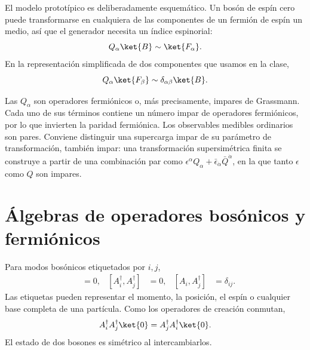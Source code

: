 El modelo prototípico es deliberadamente esquemático. Un bosón de espín cero puede transformarse en cualquiera de las componentes de un fermión de espín un medio, así que el generador necesita un índice espinorial:
\begin{equation}
Q_\alpha\ket{B}\sim\ket{F_\alpha}.
\end{equation}
En la representación simplificada de dos componentes que usamos en la clase,
\begin{equation}
Q_\alpha\ket{F_\beta}\sim\delta_{\alpha\beta}\ket{B}.
\end{equation}

\begin{classroomqa}
\end{classroomqa}

Las \(Q_\alpha\) son operadores fermiónicos o, más precisamente, impares de Grassmann. Cada uno de sus términos contiene un número impar de operadores fermiónicos, por lo que invierten la paridad fermiónica. Los observables medibles ordinarios son pares. Conviene distinguir una supercarga impar de su parámetro de transformación, también impar: una transformación supersimétrica finita se construye a partir de una combinación par como \(\epsilon^\alpha Q_\alpha+\bar\epsilon_{\dot\alpha}\bar Q^{\dot\alpha}\), en la que tanto \(\epsilon\) como \(Q\) son impares. 

\section{Álgebras de operadores bosónicos y fermiónicos}

Para modos bosónicos etiquetados por \(i,j\),
\begin{align}
[A_i,A_j]&=0,&
[A_i^\dagger,A_j^\dagger]&=0,&
[A_i,A_j^\dagger]&=\delta_{ij}.
\end{align}
Las etiquetas pueden representar el momento, la posición, el espín o cualquier base completa de una partícula. Como los operadores de creación conmutan,
\begin{equation}
A_i^\dagger A_j^\dagger\ket{0}
=A_j^\dagger A_i^\dagger\ket{0}.
\end{equation}
El estado de dos bosones es simétrico al intercambiarlos.

